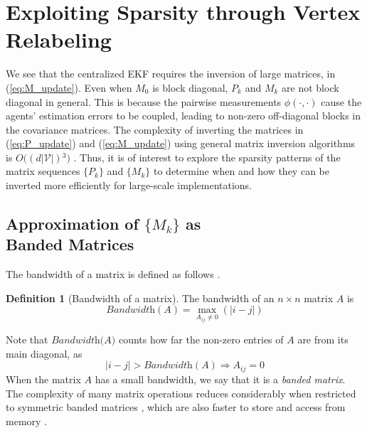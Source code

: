 \documentclass[twocolumn]{article}
\theoremstyle{plain}
\theoremstyle{definition}
\newtheorem*{definition}{Definition}
\theoremstyle{definition}
\theoremstyle{remark}
\begin{document}
\section{Exploiting Sparsity through Vertex Relabeling}
\label{sec:efficient}
We see that the centralized EKF requires the inversion of large matrices, in (\ref{eq:M_update}). Even when $M_0$ is block diagonal, $P_k$ and $M_k$ are not block diagonal in general. This is because the pairwise measurements $\phi(\cdot, \cdot)$ cause the agents' estimation errors to be coupled, leading to non-zero off-diagonal blocks in the covariance matrices. The complexity of inverting the matrices in (\ref{eq:P_update}) and (\ref{eq:M_update}) using general matrix inversion algorithms is $O($\small$(d|\mathcal V|)$\normalsize$^3)$ \cite{cormen2022introduction}. Thus, it is of interest to explore the sparsity patterns of the matrix sequences $\lbrace P_k \rbrace$ and $\lbrace M_k \rbrace$ to determine when and how they can be inverted more efficiently for large-scale implementations.

\subsection{Approximation of $\lbrace M_k \rbrace$ as \\Banded Matrices}
\label{sec:matrix_bandwidth}
\noindent
The bandwidth of a matrix is defined as follows \cite{bandwidthsSurvey2014}.
\begin{definition}[Bandwidth of a matrix]
The bandwidth of an $n\times n$ matrix $A$ is
\begin{equation}
\textit{Bandwidth}(A) = \max_{A_{ij}\neq 0} \left( |i - j|  \right)
\label{def:band}
\end{equation}
\end{definition}
\noindent
Note that $\textit{Bandwidth(A)}$ counts how far the non-zero entries of $A$ are from its main diagonal, as
\begin{equation}
    |i-j| > \textit{Bandwidth}(A) \Rightarrow A_{ij}=0
\end{equation}
When the matrix $A$ has a small bandwidth, we say that it is a \textit{banded matrix}.
The complexity of many matrix operations reduces considerably when restricted to symmetric banded matrices \cite{kavcic2000matrices, liao2016improved_band_matrix_computation}, which are also faster to store and access from memory \cite{rcm2017}.
\end{document}
